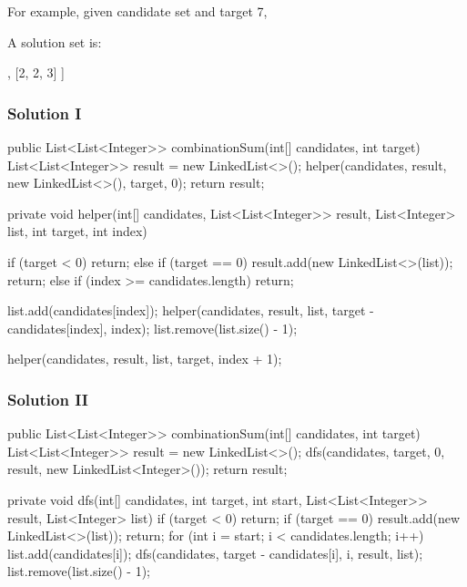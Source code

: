 For example, given candidate set \code{[2, 3, 6, 7]} and target 7,

A solution set is:
\begin{code}
[
  [7],
  [2, 2, 3]
]
\end{code}

\subsubsection{Solution I}

\begin{Code}
public List<List<Integer>> combinationSum(int[] candidates, int target) {
    List<List<Integer>> result = new LinkedList<>();
    helper(candidates, result, new LinkedList<>(), target, 0);
    return result;
}

private void helper(int[] candidates, List<List<Integer>> result, List<Integer> list, int target, int index) {
    if (target < 0) {
        return;
    } else if (target == 0) {
        result.add(new LinkedList<>(list));
        return;
    } else if (index >= candidates.length) {
        return;
    }

    list.add(candidates[index]);
    helper(candidates, result, list, target - candidates[index], index);
    list.remove(list.size() - 1);

    helper(candidates, result, list, target, index + 1);
}

\end{Code}

\newpage

\subsubsection{Solution II}

\begin{Code}

public List<List<Integer>> combinationSum(int[] candidates, int target) {
    List<List<Integer>> result = new LinkedList<>();
    dfs(candidates, target, 0, result, new LinkedList<Integer>());
    return result;
}

private void dfs(int[] candidates, int target, int start, List<List<Integer>> result, List<Integer> list) {
    if (target < 0) {
        return;
    }
    if (target == 0) {
        result.add(new LinkedList<>(list));
        return;
    }
    for (int i = start; i < candidates.length; i++) {
        list.add(candidates[i]);
        dfs(candidates, target - candidates[i], i, result, list);
        list.remove(list.size() - 1);
    }
}
\end{Code}

